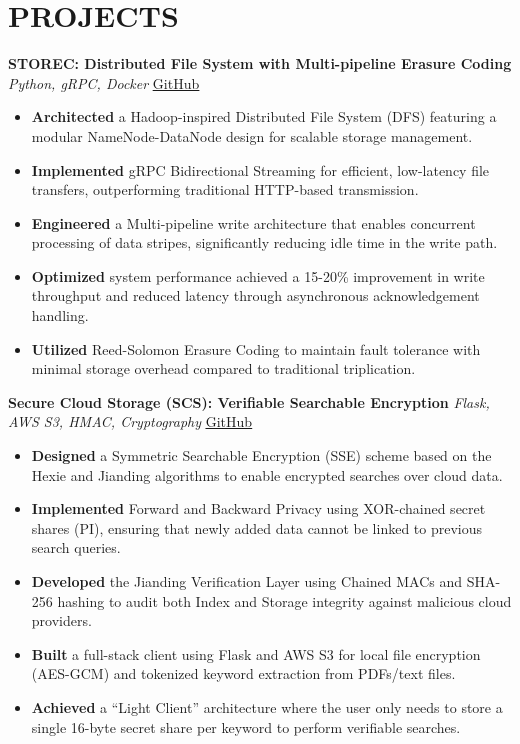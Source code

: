 \documentclass[letterpaper,10pt]{article}
\begin{document}
\section*{PROJECTS}
\vspace{2pt}

\textbf{STOREC: Distributed File System with Multi-pipeline Erasure Coding} \textbar{} \textit{Python, gRPC, Docker} \textbar{} \href{https://github.com/Venukumar975/STOREC}{\underline{GitHub}}
\begin{itemize}[leftmargin=*,noitemsep,topsep=2pt,parsep=0pt,partopsep=0pt]
    \item \textbf{Architected} a Hadoop-inspired Distributed File System (DFS) featuring a modular NameNode-DataNode design for scalable storage management.
    \item \textbf{Implemented} gRPC Bidirectional Streaming for efficient, low-latency file transfers, outperforming traditional HTTP-based transmission.
    \item \textbf{Engineered} a Multi-pipeline write architecture that enables concurrent processing of data stripes, significantly reducing idle time in the write path.
    \item \textbf{Optimized} system performance achieved a 15-20\% improvement in write throughput and reduced latency through asynchronous acknowledgement handling.
    \item \textbf{Utilized} Reed-Solomon Erasure Coding to maintain fault tolerance with minimal storage overhead compared to traditional triplication.
\end{itemize}

\vspace{4pt}

\textbf{Secure Cloud Storage (SCS): Verifiable Searchable Encryption} \textbar{} \textit{Flask, AWS S3, HMAC, Cryptography} \textbar{} \href{https://github.com/Venukumar975/SCS}{\underline{GitHub}}
\begin{itemize}[leftmargin=*,noitemsep,topsep=2pt,parsep=0pt,partopsep=0pt]
    \item \textbf{Designed} a Symmetric Searchable Encryption (SSE) scheme based on the Hexie and Jianding algorithms to enable encrypted searches over cloud data.
    \item \textbf{Implemented} Forward and Backward Privacy using XOR-chained secret shares (PI), ensuring that newly added data cannot be linked to previous search queries.
    \item \textbf{Developed} the Jianding Verification Layer using Chained MACs and SHA-256 hashing to audit both Index and Storage integrity against malicious cloud providers.
    \item \textbf{Built} a full-stack client using Flask and AWS S3 for local file encryption (AES-GCM) and tokenized keyword extraction from PDFs/text files.
    \item \textbf{Achieved} a ``Light Client'' architecture where the user only needs to store a single 16-byte secret share per keyword to perform verifiable searches.
\end{itemize}
\end{document}
